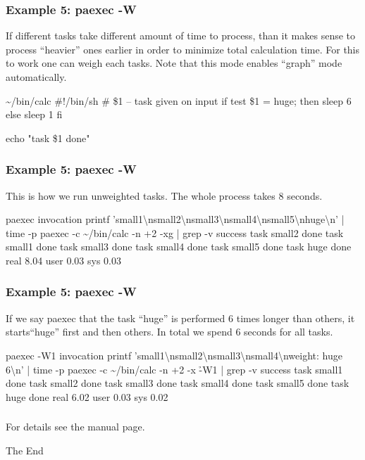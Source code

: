 \documentclass[hyperref={colorlinks=true}]{beamer}
\begin{document}
\begin{frame}[fragile]
  \frametitle{Example 5: paexec -W}
If different tasks take different amount of time to process, than it
makes sense to process ``heavier'' ones earlier in order to minimize
total calculation time. For this to work one can weigh each tasks.
Note that this mode enables ``graph'' mode automatically.
\begin{block}{}
  \begin{CodeSmall}{\~{}/bin/calc}
#!/bin/sh
# \$1 -- task given on input
if test \$1 = huge; then
    sleep 6
else
    sleep 1
fi

echo "task \$1 done"
  \end{CodeSmall}
\end{block}
\end{frame}

\begin{frame}[fragile]
  \frametitle{Example 5: paexec -W}
This is how we run unweighted tasks. The whole process takes 8 seconds.
\begin{block}{}
  \begin{CodeSmall}{paexec invocation}
\prompt{\$} printf 'small1\textbackslash{nsmall2}\textbackslash{nsmall3}\textbackslash{nsmall4}\textbackslash{nsmall5}\textbackslash{nhuge}\textbackslash{n}' |
time -p paexec -c \~{}/bin/calc -n +2 -xg | grep -v success
task small2 done
task small1 done
task small3 done
task small4 done
task small5 done
task huge done
real         8.04
user         0.03
sys          0.03
\prompt{\$}
  \end{CodeSmall}
\end{block}
\end{frame}

\begin{frame}[fragile]
  \frametitle{Example 5: paexec -W}
If we say paexec that the task ``huge'' is performed 6 times longer than others,
it starts``huge'' first and then others. In total we spend 6 seconds for all tasks.
\begin{block}{}
  \begin{CodeSmall}{paexec -W1 invocation}
\prompt{\$} printf 'small1\textbackslash{nsmall2}\textbackslash{nsmall3}\textbackslash{nsmall4}\textbackslash{nweight: huge 6}\textbackslash{n}' |
time -p paexec -c \~{}/bin/calc -n +2 -x \h{-W1} | grep -v success
task small1 done
task small2 done
task small3 done
task small4 done
task small5 done
task huge done
real         6.02
user         0.03
sys          0.02
\prompt{\$}
  \end{CodeSmall}
\end{block}
\end{frame}

\begin{frame}[fragile]
  \frametitle{}
  For details see the manual page.
  \begin{center}
    \huge
    The End
  \end{center}
\end{frame}

\end{document}
